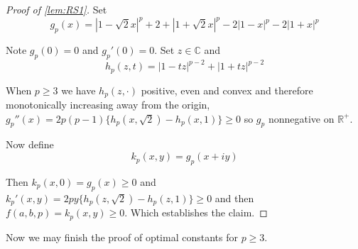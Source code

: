 \documentclass[10pt]{article}
\newcommand{\1}{\textbf{1}}
\newcommand{\R}{\mathbb{R}}
\newcommand{\C}{\mathbb{C}}
\newcommand{\normOne}[1]{\left\lvert#1\right\rvert}
\theoremstyle{remark}
\theoremstyle{definition}
\begin{document}
\begin{proof}[Proof of \ref{lem:RS1}]

Set 
	\begin{equation*}
		g_p(x) = \normOne{1-\sqrt{2}x}^p + 2 + \normOne{1+\sqrt{2}x}^p-2\normOne{1-x}^p-2\normOne{1+x}^p
	\end{equation*}

	Note $g_p(0) = 0$ and $g_p'(0) = 0$. Set $z \in \C$ and 
	\begin{equation*}
		h_p(z,t) = \normOne{1-tz}^{p-2}+\normOne{1+tz}^{p-2}
	\end{equation*}

	When $p \geq 3$ we have $h_p(z,\cdot)$ positive, even and convex and therefore monotonically increasing away from the origin, $g_p''(x) = 2p(p-1)\{h_p(x,\sqrt{2})-h_p(x,1)\} \geq 0$ so $g_p$ nonnegative on $\R^+$. 

	Now define 
	\begin{equation*}
		k_p(x,y) = g_p(x+iy)
	\end{equation*}

	Then $k_p(x,0) = g_p(x) \geq 0$ and $k_p'(x,y) = 2py\{h_p(z,\sqrt{2})-h_p(z,1)\} \geq 0$ and then $f(a,b,p) = k_p(x,y) \geq 0$. Which establishes the claim.
\end{proof}

Now we may finish the proof of optimal constants for $p \geq 3$. 
\end{document}
